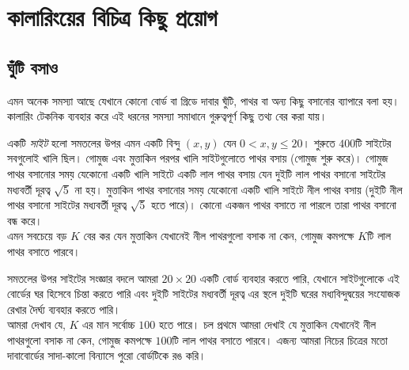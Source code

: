 \documentclass[11pt]{report}
\begin{document}
\chapter{কালারিংয়ের বিচিত্র কিছু প্রয়োগ}

\section{ঘুঁটি বসাও}

এমন অনেক সমস্যা আছে যেখানে কোনো বোর্ড বা গ্রিডে দাবার ঘুঁটি, পাথর বা অন্য কিছু বসানোর ব্যাপারে বলা হয়। কালারিং টেকনিক ব্যবহার করে এই ধরনের সমস্যা সমাধানে গুরুত্বপূর্ণ কিছু তথ্য বের করা যায়।\\

\begin{tcolorbox}[colframe=black!80!green,title=IMO 2018]
একটি \textit{সাইট} হলো সমতলের উপর এমন একটি বিন্দু $(x, y)$ যেন $0 < x, y \leq 20$। শুরুতে $400$টি সাইটের সবগুলোই খালি ছিল। গোমুজ এবং মুত্তাকিন পরপর খালি সাইটগুলোতে পাথর বসায় (গোমুজ শুরু করে)। গোমুজ পাথর বসানোর সময় যেকোনো একটি খালি সাইটে একটি লাল পাথর বসায় যেন দুইটি লাল পাথর বসানো সাইটের মধ্যবর্তী দূরত্ব $\sqrt{5}$ না হয়। মুত্তাকিন পাথর বসানোর সময় যেকোনো একটি খালি সাইটে নীল পাথর বসায় (দুইটি নীল পাথর বসানো সাইটের মধ্যবর্তী দূরত্ব $\sqrt{5}$ হতে পারে)। কোনো একজন পাথর বসাতে না পারলে তারা পাথর বসানো বন্ধ করে।\\

এমন সবচেয়ে বড় $K$ বের কর যেন মুত্তাকিন যেখানেই নীল পাথরগুলো বসাক না কেন, গোমুজ কমপক্ষে $K$টি লাল পাথর বসাতে পারবে।
\end{tcolorbox}

সমতলের উপর সাইটের সংজ্ঞার বদলে আমরা $20 \times 20$ একটি বোর্ড ব্যবহার করতে পারি, যেখানে সাইটগুলোকে এই বোর্ডের ঘর হিসেবে চিন্তা করতে পারি এবং দুইটি সাইটের মধ্যবর্তী দূরত্ব এর স্থলে দুইটি ঘরের মধ্যবিন্দুদ্বয়ের সংযোজক রেখার দৈর্ঘ্য ব্যবহার করতে পারি।\\

আমরা দেখাব যে, $K$ এর মান সর্বোচ্চ $100$ হতে পারে। চল প্রথমে আমরা দেখাই যে মুত্তাকিন যেখানেই নীল পাথরগুলো বসাক না কেন, গোমুজ কমপক্ষে $100$টি লাল পাথর বসাতে পারবে। এজন্য আমরা নিচের চিত্রের মতো দাবাবোর্ডের সাদা-কালো বিন্যাসে পুরো বোর্ডটিকে রঙ করি।\\

\begin{center}
\end{center}
\end{document}
